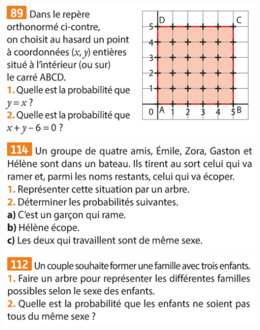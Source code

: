 \documentclass{article}
\begin{document}
\begin{center}
\begin{minipage}{0.45\textwidth}
\end{minipage}
\hfill\vline\hfill
\begin{minipage}{0.45\textwidth}
\includegraphics[width=\textwidth]{Exercice_3.png}
\includegraphics[width=\textwidth]{Exercice_4.png}
\includegraphics[width=\textwidth]{Exercice_5.png}
\end{minipage}
\end{center}
\end{document}
